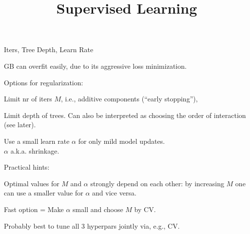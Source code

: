 \documentclass[11pt,compress,t,notes=noshow, xcolor=table]{beamer}
\title{Supervised Learning}
\date{}
\begin{document}



\begin{vbframe}{Iters, Tree Depth, Learn Rate}

GB can overfit easily, due to its aggressive loss minimization.

\begin{blocki}{Options for regularization:}
\item Limit nr of iters $M$, i.e., additive components (\enquote{early stopping}),
\item Limit depth of trees.
    Can also be interpreted as choosing the order of interaction (see later).
\item Use a small learn rate $\alpha$ for only mild model updates. \\
    $\alpha$ a.k.a. shrinkage.
\end{blocki}







\begin{blocki}{Practical hints:}
\item Optimal values for $M$ and $\alpha$ strongly depend on each other:
by increasing $M$ one can use a smaller value for $\alpha$ and vice versa.

\item Fast option = Make $\alpha$ small and choose $M$ by CV. 

\item Probably best to tune all 3 hyperpars jointly via, e.g., CV.
\end{blocki}

\end{vbframe}
\end{document}
